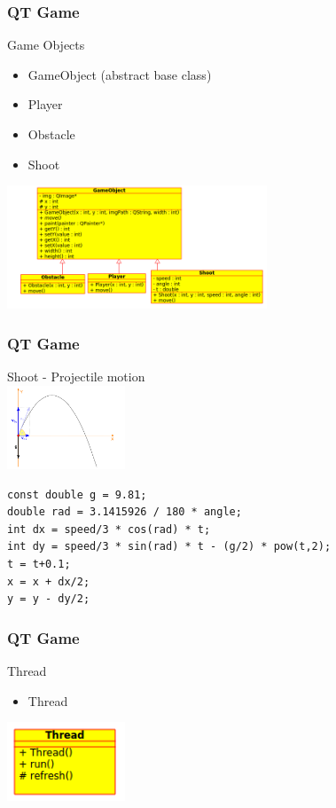 \begin{frame}[fragile]
\frametitle{QT Game}
Game Objects
\begin{itemize}
\item GameObject (abstract base class)
\item Player
\item Obstacle
\item Shoot
\end{itemize}
\includegraphics[width=220pt]{img/qtgame_cdgo.png}
\end{frame}

\begin{frame}[fragile]
\frametitle{QT Game}
Shoot - Projectile motion\\
\includegraphics[width=100pt]{img/pro_motion.png}

{\small
\begin{lstlisting}
const double g = 9.81;
double rad = 3.1415926 / 180 * angle;
int dx = speed/3 * cos(rad) * t;
int dy = speed/3 * sin(rad) * t - (g/2) * pow(t,2);
t = t+0.1;
x = x + dx/2;
y = y - dy/2;
\end{lstlisting}
}
\end{frame}

\begin{frame}[fragile]
\frametitle{QT Game}
Thread
\begin{itemize}
\item Thread
\end{itemize}
\includegraphics[width=100pt]{img/qtgame_cdthread.png}
\end{frame}

